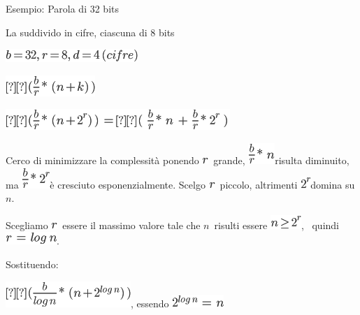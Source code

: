 \documentclass{article}
\begin{document}
{{Esempio: Parola di 32 bits}

{La suddivido in cifre, ciascuna di 8 bits}

\includegraphics{images/image204.png}

\includegraphics{images/image205.png}

\includegraphics{images/image206.png}

{Cerco di minimizzare la complessità ponendo
}\includegraphics{images/image83.png}{~grande,
}\includegraphics{images/image207.png}{risulta diminuito, ma }\includegraphics{images/image208.png}{è cresciuto esponenzialmente.
Scelgo }\includegraphics{images/image83.png}{~piccolo, altrimenti
}\includegraphics{images/image209.png}{domina su
}$n${.}

{Scegliamo }\includegraphics{images/image83.png}{~essere il massimo
valore tale che }$n${~risulti essere
}\includegraphics{images/image210.png}{, ~quindi
}\includegraphics{images/image211.png}{.}

{Sostituendo:}

\includegraphics{images/image212.png}{, essendo
}\includegraphics{images/image213.png}{~}

}
\end{document}
